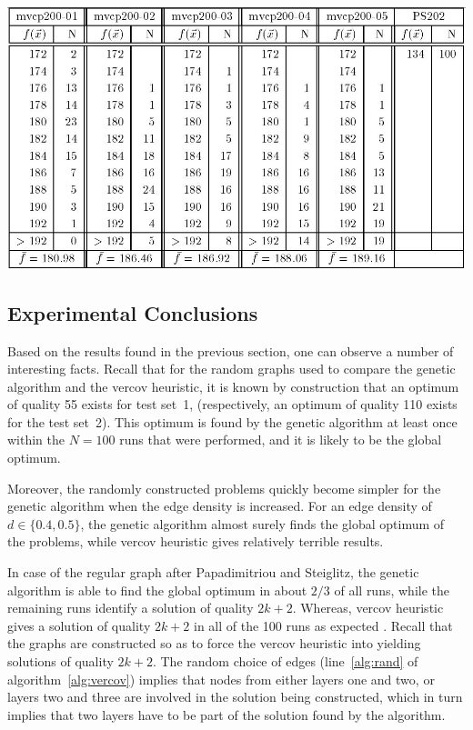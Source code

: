 \documentclass[12pt]{article}
\begin{document}
\begin{table}[!htb]
\centering
\includegraphics[width=1\textwidth]{t4}
\caption[Results obtained by vercov heuristic for graphs in test set~2]{%
Experimental results obtained by the vercov heuristic for five random graphs of size $n = 200$ with edge density: $d = 0.1$ (``mvcp200-01''), $d = 0.2$ (``mvcp200-02''), $d = 0.3$ (``mvcp200-03''), $d = 0.5$ (``mvcp200-04''), $d = 0.5$ (``mvcp200-05'') and the regular graph of size $n = 202 \ (k=66)$ from Papadimitriou and Steiglitz (``PS202'').%
}
\label{tbl:t4}
\end{table}


\subsection{Experimental Conclusions}
Based on the results found in the previous section,
one can observe a number of interesting facts.
Recall that for the random graphs used to compare the
genetic algorithm and the vercov heuristic,
it is known by construction that an optimum of
quality 55 exists for test set~1,
(respectively, an optimum of quality 110 exists
for the test set~2).
This optimum is found by the genetic algorithm at least once
within the $N = 100$ runs that were performed,
and it is likely to be the global optimum.

Moreover, the randomly constructed problems quickly
become simpler for the genetic algorithm when the edge
density is increased.
For an edge density of $d \in \{0.4, 0.5\}$, the
genetic algorithm almost surely finds the global optimum
of the problems, while vercov heuristic gives relatively terrible results.

In case of the regular graph after Papadimitriou and
Steiglitz, the genetic algorithm is able to find the global
optimum in about $2/3$ of all runs, while the remaining
runs identify a solution of quality $2k + 2$.
Whereas, vercov heuristic gives a solution of
quality $2k + 2$ in all of the 100 runs as expected \cite{10:mvcp}.
Recall that the graphs are constructed
so as to force the vercov heuristic into yielding solutions
of quality $2k + 2$.
The random choice of edges (line~\ref{alg:rand} of algorithm~\ref{alg:vercov})
implies that nodes from either layers one and two, or layers two and three
are involved in the solution being constructed,
which in turn implies that two layers have to be part of the solution
found by the algorithm.
\end{document}
